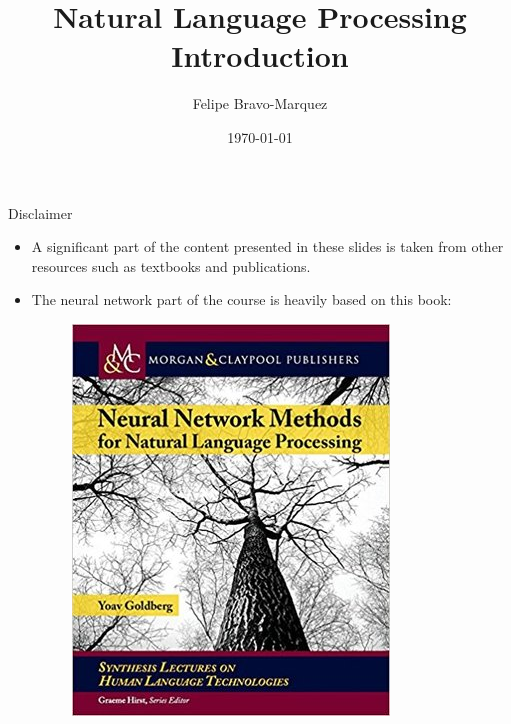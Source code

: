 \documentclass[handout]{beamer}
\title{Natural Language Processing \\ Introduction}
\author[Felipe Bravo Márquez]{\footnotesize
 \textcolor[rgb]{0.00,0.00,1.00}{Felipe Bravo-Marquez}}
\date{\today}
\begin{document}
\begin{frame}
\titlepage


\end{frame}


\begin{frame}{Disclaimer}
\begin{scriptsize}
\begin{itemize}
 \item  A significant part of the content presented in these slides is taken from other resources such as textbooks and publications.  
 \item  The neural network part of the course is heavily based on this book:
   \begin{figure}[h]
        	\includegraphics[scale = 0.4]{pics/goldbergNLP.jpg}
        \end{figure}
\end{itemize}
\end{scriptsize}

 
\end{frame}
\end{document}
